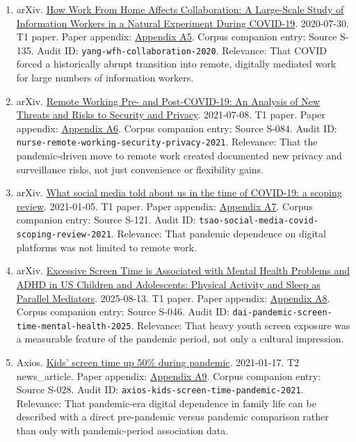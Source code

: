 \documentclass[
  american,
  11pt,
  letterpaper,
]{article}
\begin{document}
\begin{enumerate}
\item
  arXiv. \href{https://arxiv.org/abs/2007.15584}{How Work From Home
  Affects Collaboration: A Large-Scale Study of Information Workers in a
  Natural Experiment During COVID-19}. 2020-07-30. T1 paper. Paper
  appendix:
  \hyperref[appendix-a5-how-work-from-home-affects-collaboration-a-large-scale-study-of-information-workers-in-a-natural-experiment-during-covid-19]{Appendix
  A5}. Corpus companion entry: Source S-135. Audit ID:
  \texttt{yang-wfh-collaboration-2020}. Relevance: That COVID forced a
  historically abrupt transition into remote, digitally mediated work
  for large numbers of information workers.
\item
  arXiv. \href{https://arxiv.org/abs/2107.03907}{Remote Working Pre- and
  Post-COVID-19: An Analysis of New Threats and Risks to Security and
  Privacy}. 2021-07-08. T1 paper. Paper appendix:
  \hyperref[appendix-a6-remote-working-pre-and-post-covid-19-an-analysis-of-new-threats-and-risks-to-security-and-privacy]{Appendix
  A6}. Corpus companion entry: Source S-084. Audit ID:
  \texttt{nurse-remote-working-security-privacy-2021}. Relevance: That
  the pandemic-driven move to remote work created documented new privacy
  and surveillance risks, not just convenience or flexibility gains.
\item
  arXiv. \href{https://arxiv.org/abs/2101.01688}{What social media told
  about us in the time of COVID-19: a scoping review}. 2021-01-05. T1
  paper. Paper appendix:
  \hyperref[appendix-a7-what-social-media-told-about-us-in-the-time-of-covid-19-a-scoping-review]{Appendix
  A7}. Corpus companion entry: Source S-121. Audit ID:
  \texttt{tsao-social-media-covid-scoping-review-2021}. Relevance: That
  pandemic dependence on digital platforms was not limited to remote
  work.
\item
  arXiv. \href{https://arxiv.org/abs/2508.10062}{Excessive Screen Time
  is Associated with Mental Health Problems and ADHD in US Children and
  Adolescents: Physical Activity and Sleep as Parallel Mediators}.
  2025-08-13. T1 paper. Paper appendix:
  \hyperref[appendix-a8-excessive-screen-time-is-associated-with-mental-health-problems-and-adhd-in-us-children-and-adolescents-physical-activity-and-sleep-as-parallel-mediators]{Appendix
  A8}. Corpus companion entry: Source S-046. Audit ID:
  \texttt{dai-pandemic-screen-time-mental-health-2025}. Relevance: That
  heavy youth screen exposure was a measurable feature of the pandemic
  period, not only a cultural impression.
\item
  Axios.
  \href{https://www.axios.com/2021/01/17/kids-screen-time-pandemic}{Kids'
  screen time up 50\% during pandemic}. 2021-01-17. T2 news\_article.
  Paper appendix:
  \hyperref[appendix-a9-kids-screen-time-up-50-during-pandemic]{Appendix
  A9}. Corpus companion entry: Source S-028. Audit ID:
  \texttt{axios-kids-screen-time-pandemic-2021}. Relevance: That
  pandemic-era digital dependence in family life can be described with a
  direct pre-pandemic versus pandemic comparison rather than only with
  pandemic-period association data.
\end{enumerate}
\end{document}
